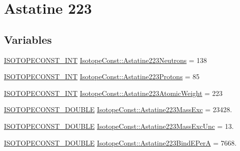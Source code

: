 \hypertarget{group___isotope_const-_astatine-_at223}{}\section{Astatine 223}
\label{group___isotope_const-_astatine-_at223}
\subsection*{Variables}
\begin{DoxyCompactItemize}
\item 
\mbox{\hyperlink{group___isotope_const-_macros_ga5f18360b3e99483a35c32d789e62621c}{I\+S\+O\+T\+O\+P\+E\+C\+O\+N\+S\+T\+\_\+\+I\+NT}} \mbox{\hyperlink{group___isotope_const-_astatine-_at223_ga35dada7896ff59f0c26319f972d353e1}{Isotope\+Const\+::\+Astatine223\+Neutrons}} = 138
\item 
\mbox{\hyperlink{group___isotope_const-_macros_ga5f18360b3e99483a35c32d789e62621c}{I\+S\+O\+T\+O\+P\+E\+C\+O\+N\+S\+T\+\_\+\+I\+NT}} \mbox{\hyperlink{group___isotope_const-_astatine-_at223_gaad5863b3c6cb8bfeb4bd1a6c80d9b9c8}{Isotope\+Const\+::\+Astatine223\+Protons}} = 85
\item 
\mbox{\hyperlink{group___isotope_const-_macros_ga5f18360b3e99483a35c32d789e62621c}{I\+S\+O\+T\+O\+P\+E\+C\+O\+N\+S\+T\+\_\+\+I\+NT}} \mbox{\hyperlink{group___isotope_const-_astatine-_at223_gafc389a5df2039d90ca035bf5be03edb2}{Isotope\+Const\+::\+Astatine223\+Atomic\+Weight}} = 223
\item 
\mbox{\hyperlink{group___isotope_const-_macros_ga8f45a7272ce02c0b4c65c44636ed719a}{I\+S\+O\+T\+O\+P\+E\+C\+O\+N\+S\+T\+\_\+\+D\+O\+U\+B\+LE}} \mbox{\hyperlink{group___isotope_const-_astatine-_at223_gaffb9148f697edad9ed27cb59e3268d68}{Isotope\+Const\+::\+Astatine223\+Mass\+Exc}} = 23428.
\item 
\mbox{\hyperlink{group___isotope_const-_macros_ga8f45a7272ce02c0b4c65c44636ed719a}{I\+S\+O\+T\+O\+P\+E\+C\+O\+N\+S\+T\+\_\+\+D\+O\+U\+B\+LE}} \mbox{\hyperlink{group___isotope_const-_astatine-_at223_gad769ae1eb6df6adfb8d5d2a2026e41d6}{Isotope\+Const\+::\+Astatine223\+Mass\+Exc\+Unc}} = 13.
\item 
\mbox{\hyperlink{group___isotope_const-_macros_ga8f45a7272ce02c0b4c65c44636ed719a}{I\+S\+O\+T\+O\+P\+E\+C\+O\+N\+S\+T\+\_\+\+D\+O\+U\+B\+LE}} \mbox{\hyperlink{group___isotope_const-_astatine-_at223_gafbcf6b95c6919be073f302b0d95d11a1}{Isotope\+Const\+::\+Astatine223\+Bind\+E\+PerA}} = 7668.
\item 

\end{DoxyCompactItemize}
